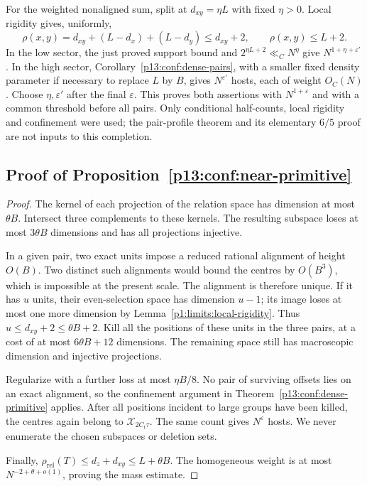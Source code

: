 For the weighted nonaligned sum, split at
$d_{xy}=\eta L$ with fixed $\eta>0$. Local rigidity gives, uniformly,
\[
 \rho(x,y)=d_{xy}+(L-d_x)+(L-d_y)\le d_{xy}+2,
 \qquad \rho(x,y)\le L+2.
\]
In the low sector, the just proved support bound and
$2^{\eta L+2}\ll_C N^\eta$ give
$N^{1+\eta+\varepsilon'}$. In the high sector,
Corollary~\ref{p13:conf:dense-pairs}, with a smaller fixed density
parameter if necessary to replace $L$ by $B$, gives
$N^{\varepsilon'}$ hosts, each of weight $O_C(N)$.
Choose $\eta,\varepsilon'$ after the final $\varepsilon$.
This proves both assertions with $N^{1+\varepsilon}$ and with a
common threshold before all pairs. Only conditional half-counts,
local rigidity and confinement were used; the pair-profile theorem
and its elementary $6/5$ proof are not inputs to this completion.

\subsection{Proof of Proposition~\ref{p13:conf:near-primitive}}
\label{p14:comp:confinement:near}

\begin{proof}
The kernel of each projection of the relation space
has dimension at most \(\theta B\).
Intersect three complements to these kernels.
The resulting subspace loses at most \(3\theta B\)
dimensions and has all projections injective.

In a given pair, two exact units impose a reduced rational
alignment of height \(O(B)\). Two distinct such alignments
would bound the centres by \(O(B^3)\), which is impossible
at the present scale. The alignment is therefore unique.
If it has \(u\) units, their even-selection space has
dimension \(u-1\); its image loses at most one more
dimension by Lemma~\ref{p1:limits:local-rigidity}.
Thus \(u\le d_{xy}+2\le\theta B+2\).
Kill all the positions of these units in the three pairs,
at a cost of at most \(6\theta B+12\) dimensions.
The remaining space still has macroscopic dimension
and injective projections.

Regularize with a further loss at most \(\eta B/8\).
No pair of surviving offsets lies on an exact alignment,
so the confinement argument in
Theorem~\ref{p13:conf:dense-primitive} applies.
After all positions incident to large groups have been
killed, the centres again belong to
\(\mathcal X_{2C_t\tau}\).
The same count gives \(N^\varepsilon\) hosts.
We never enumerate the chosen subspaces or deletion sets.

Finally,
\(\rho_{\mathrm{rel}}(T)\le d_z+d_{xy}\le L+\theta B\).
The homogeneous weight is at most
\(N^{-2+\theta+o(1)}\), proving the mass estimate.
\end{proof}

